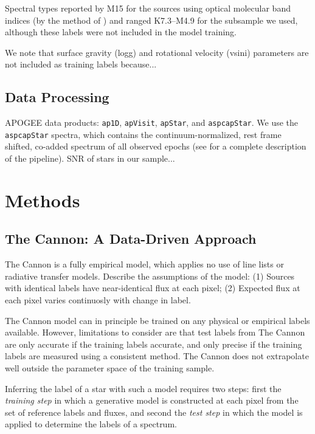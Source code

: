 \documentclass[preprint]{aastex62}
\begin{document}
Spectral types reported by M15 for the sources using optical molecular band indices (by the method of \citealt{Lepine:2013}) and ranged K7.3--M4.9 for the subsample we used, although these labels were not included in the model training.

We note that surface gravity (logg) and rotational velocity (vsini) parameters are not included as training labels because...
\color{gcolor}{MANN: comments to add? particularly about the extension sample?}\color{black}

\subsection{Data Processing}

APOGEE data products: {\tt\string ap1D}, {\tt\string apVisit}, {\tt\string apStar}, and {\tt\string aspcapStar}. We use the {\tt\string aspcapStar} spectra, which contains the continuum-normalized, rest frame shifted, co-added spectrum of all observed epochs (see \citealt{Perez:2016} for a complete description of the pipeline). SNR of stars in our sample...


\section{Methods} \label{sec:cannon}

\subsection{The Cannon: A Data-Driven Approach}

The Cannon is a fully empirical model, which applies no use of line lists or radiative transfer models. Describe the assumptions of the model: (1) Sources with identical labels have near-identical flux at each pixel; (2) Expected flux at each pixel varies continuosly with change in label. 

The Cannon model can in principle be trained on any physical or empirical labels available. However, limitations to consider are that test labels from The Cannon are only accurate if the training labels accurate, and only precise if the training labels are measured using a consistent method. The Cannon does not extrapolate well outside the parameter space of the training sample.

Inferring the label of a star with such a model requires two steps: first the \emph{training step} in which a generative model is constructed at each pixel from the set of reference labels and fluxes, and second the \emph{test step} in which the model is applied to determine the labels of a spectrum.
\end{document}
